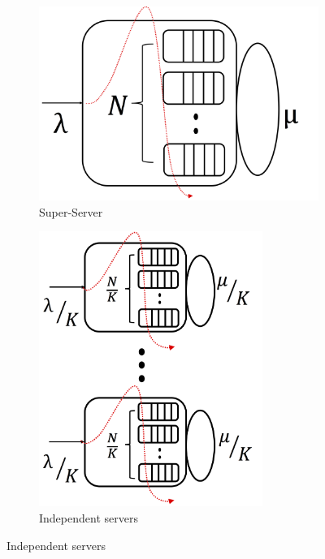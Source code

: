 \begin{figure}
	\centering
	\begin{subfigure}[b]{0.3\textwidth}
		\centering
		\includegraphics[width=\textwidth]{Chapter3/Figures/switchone}
		\smallskip
		\caption{Super-Server}
		\label{fig:switchone}
	\end{subfigure}
	\hfill
	\begin{subfigure}[b]{0.3\textwidth}
		\centering
		\includegraphics[width=0.8\textwidth]{Chapter3/Figures/esn}
		\caption{Independent servers}

\end{subfigure}
\end{figure}
